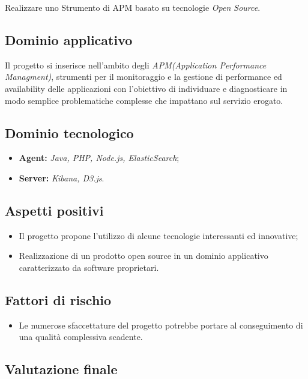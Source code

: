 \documentclass[openany,12pt,a4paper]{report}
\begin{document}
	Realizzare uno Strumento di APM basato su tecnologie \textit{Open Source}.

	\subsection{Dominio applicativo}

	Il progetto si inserisce nell'ambito degli \textit{APM(Application Performance Managment)}, strumenti per il monitoraggio e la gestione di performance ed availability delle applicazioni con l’obiettivo di individuare e diagnosticare in modo semplice problematiche complesse che impattano sul servizio erogato.

	\subsection{Dominio tecnologico}

	\begin{itemize}
		\item \textbf{Agent:} \textit{Java, PHP, Node.js, ElasticSearch};

		\item \textbf{Server:} \textit{Kibana, D3.js}.
	\end{itemize}

	\subsection{Aspetti positivi}

	\begin{itemize}
		\item Il progetto propone l'utilizzo di alcune tecnologie interessanti ed innovative;

		\item Realizzazione di un prodotto open source in un dominio applicativo caratterizzato da software proprietari.
	\end{itemize}

	\subsection{Fattori di rischio}

	\begin{itemize}
		\item Le numerose sfaccettature del progetto potrebbe portare al conseguimento di una qualità complessiva scadente.
	\end{itemize}

	\subsection{Valutazione finale}
\end{document}
